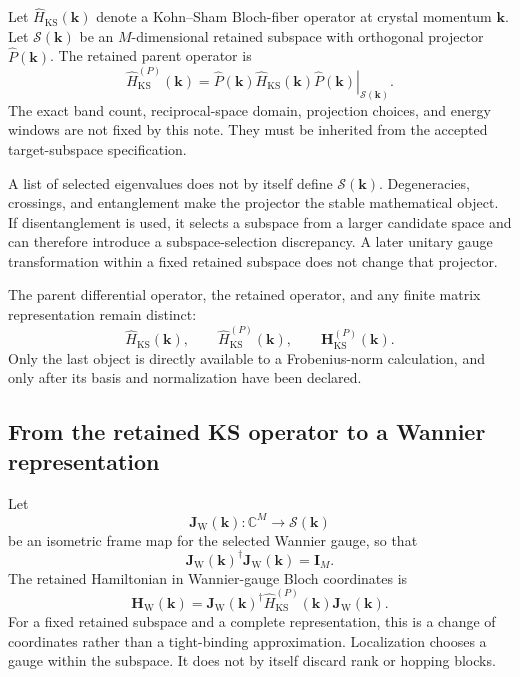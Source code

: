 Let $\hat H_{\mathrm{KS}}(\mathbf k)$ denote a Kohn--Sham Bloch-fiber
operator at crystal momentum $\mathbf k$. Let
$\mathcal S(\mathbf k)$ be an $M$-dimensional retained subspace with
orthogonal projector $\hat P(\mathbf k)$. The retained parent operator is
\begin{equation}
    \hat H_{\mathrm{KS}}^{(P)}(\mathbf k)
    =
    \left.
        \hat P(\mathbf k)
        \hat H_{\mathrm{KS}}(\mathbf k)
        \hat P(\mathbf k)
    \right|_{\mathcal S(\mathbf k)}.
\end{equation}
The exact band count, reciprocal-space domain, projection choices, and energy
windows are not fixed by this note. They must be inherited from the accepted
target-subspace specification.

A list of selected eigenvalues does not by itself define
$\mathcal S(\mathbf k)$. Degeneracies, crossings, and entanglement make the
projector the stable mathematical object. If disentanglement is used, it
selects a subspace from a larger candidate space and can therefore introduce a
subspace-selection discrepancy. A later unitary gauge transformation within a
fixed retained subspace does not change that projector.

The parent differential operator, the retained operator, and any finite matrix
representation remain distinct:
\begin{equation}
    \hat H_{\mathrm{KS}}(\mathbf k),
    \qquad
    \hat H_{\mathrm{KS}}^{(P)}(\mathbf k),
    \qquad
    \mathbf H_{\mathrm{KS}}^{(P)}(\mathbf k).
\end{equation}
Only the last object is directly available to a Frobenius-norm calculation,
and only after its basis and normalization have been declared.

\subsection*{From the retained KS operator to a Wannier representation}

Let
\begin{equation}
    \mathbf J_{\mathrm W}(\mathbf k):
    \mathbb C^M
    \longrightarrow
    \mathcal S(\mathbf k)
\end{equation}
be an isometric frame map for the selected Wannier gauge, so that
\begin{equation}
    \mathbf J_{\mathrm W}(\mathbf k)^\dagger
    \mathbf J_{\mathrm W}(\mathbf k)
    =
    \mathbf I_M.
\end{equation}
The retained Hamiltonian in Wannier-gauge Bloch coordinates is
\begin{equation}
    \mathbf H_{\mathrm W}(\mathbf k)
    =
    \mathbf J_{\mathrm W}(\mathbf k)^\dagger
    \hat H_{\mathrm{KS}}^{(P)}(\mathbf k)
    \mathbf J_{\mathrm W}(\mathbf k).
\end{equation}
For a fixed retained subspace and a complete representation, this is a change
of coordinates rather than a tight-binding approximation. Localization chooses
a gauge within the subspace. It does not by itself discard rank or hopping
blocks.

